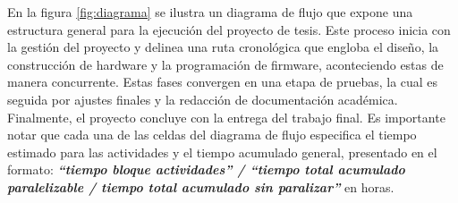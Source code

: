%

%
%
%

%

En la figura \ref{fig:diagrama} se ilustra un diagrama de flujo que expone una estructura general para la ejecución del proyecto de tesis. Este proceso inicia con la gestión del proyecto y delinea una ruta cronológica que engloba el diseño, la construcción de hardware y la programación de firmware, aconteciendo estas de manera concurrente. Estas fases convergen en una etapa de pruebas, la cual es seguida por ajustes finales y la redacción de documentación académica. Finalmente, el proyecto concluye con la entrega del trabajo final. Es importante notar que cada una de las celdas del diagrama de flujo especifica el tiempo estimado para las actividades y el tiempo acumulado general, presentado en el formato: \textbf{\textit{``tiempo bloque actividades'' / ``tiempo total acumulado paralelizable / tiempo total acumulado sin paralizar''}} en horas.



